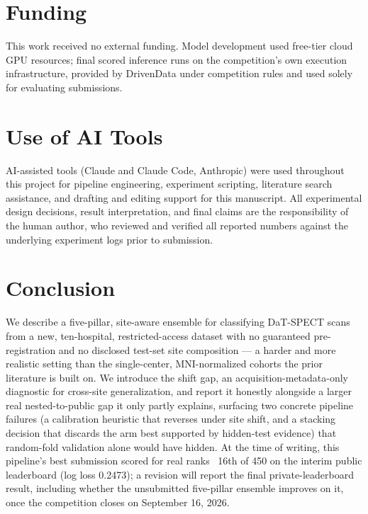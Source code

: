 \documentclass[11pt]{article}
\begin{document}
\section{Funding}
This work received no external funding. Model development used free-tier cloud GPU resources; final scored inference runs on the competition's own execution infrastructure, provided by DrivenData under competition rules and used solely for evaluating submissions.

\section{Use of AI Tools}
AI-assisted tools (Claude and Claude Code, Anthropic) were used throughout this project for pipeline engineering, experiment scripting, literature search assistance, and drafting and editing support for this manuscript. All experimental design decisions, result interpretation, and final claims are the responsibility of the human author, who reviewed and verified all reported numbers against the underlying experiment logs prior to submission.

\section{Conclusion}

We describe a five-pillar, site-aware ensemble for classifying DaT-SPECT scans from a new, ten-hospital, restricted-access dataset with no guaranteed pre-registration and no disclosed test-set site composition --- a harder and more realistic setting than the single-center, MNI-normalized cohorts the prior literature is built on. We introduce the shift gap, an acquisition-metadata-only diagnostic for cross-site generalization, and report it honestly alongside a larger real nested-to-public gap it only partly explains, surfacing two concrete pipeline failures (a calibration heuristic that reverses under site shift, and a stacking decision that discards the arm best supported by hidden-test evidence) that random-fold validation alone would have hidden. At the time of writing, this pipeline's best submission scored for real ranks ~16th of 450 on the interim public leaderboard (log loss 0.2473); a revision will report the final private-leaderboard result, including whether the unsubmitted five-pillar ensemble improves on it, once the competition closes on September 16, 2026.
\end{document}
